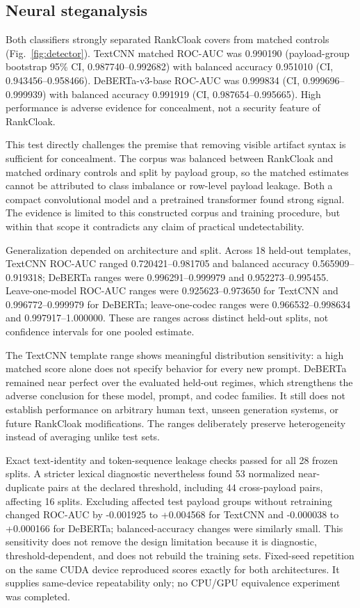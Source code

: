 \documentclass[fleqn,10pt]{wlscirep}
\begin{document}
\subsection*{Neural steganalysis}\label{sec:results-detector}

Both classifiers strongly separated RankCloak covers from matched controls (Fig.~\ref{fig:detector}). TextCNN matched ROC-AUC was 0.990190 (payload-group bootstrap 95\% CI, 0.987740--0.992682) with balanced accuracy 0.951010 (CI, 0.943456--0.958466). DeBERTa-v3-base ROC-AUC was 0.999834 (CI, 0.999696--0.999939) with balanced accuracy 0.991919 (CI, 0.987654--0.995665). High performance is adverse evidence for concealment, not a security feature of RankCloak.

This test directly challenges the premise that removing visible artifact syntax is sufficient for concealment. The corpus was balanced between RankCloak and matched ordinary controls and split by payload group, so the matched estimates cannot be attributed to class imbalance or row-level payload leakage. Both a compact convolutional model and a pretrained transformer found strong signal. The evidence is limited to this constructed corpus and training procedure, but within that scope it contradicts any claim of practical undetectability.

Generalization depended on architecture and split. Across 18 held-out templates, TextCNN ROC-AUC ranged 0.720421--0.981705 and balanced accuracy 0.565909--0.919318; DeBERTa ranges were 0.996291--0.999979 and 0.952273--0.995455. Leave-one-model ROC-AUC ranges were 0.925623--0.973650 for TextCNN and 0.996772--0.999979 for DeBERTa; leave-one-codec ranges were 0.966532--0.998634 and 0.997917--1.000000. These are ranges across distinct held-out splits, not confidence intervals for one pooled estimate.

The TextCNN template range shows meaningful distribution sensitivity: a high matched score alone does not specify behavior for every new prompt. DeBERTa remained near perfect over the evaluated held-out regimes, which strengthens the adverse conclusion for these model, prompt, and codec families. It still does not establish performance on arbitrary human text, unseen generation systems, or future RankCloak modifications. The ranges deliberately preserve heterogeneity instead of averaging unlike test sets.

Exact text-identity and token-sequence leakage checks passed for all 28 frozen splits. A stricter lexical diagnostic nevertheless found 53 normalized near-duplicate pairs at the declared threshold, including 44 cross-payload pairs, affecting 16 splits. Excluding affected test payload groups without retraining changed ROC-AUC by -0.001925 to +0.004568 for TextCNN and -0.000038 to +0.000166 for DeBERTa; balanced-accuracy changes were similarly small. This sensitivity does not remove the design limitation because it is diagnostic, threshold-dependent, and does not rebuild the training sets. Fixed-seed repetition on the same CUDA device reproduced scores exactly for both architectures. It supplies same-device repeatability only; no CPU/GPU equivalence experiment was completed.
\end{document}
